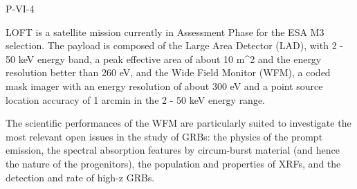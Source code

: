 P-VI-4


\bigskip



\bigskip

\noindent LOFT is a satellite mission currently in Assessment Phase for the
ESA M3 selection. The payload is composed of the Large Area
Detector (LAD), with 2 - 50 keV energy band, a peak effective area
of about 10 m^2 and the energy resolution better than 260 eV, and
the Wide Field Monitor (WFM), a coded mask imager with an energy
resolution of about 300 eV and a point source location accuracy of
1 arcmin in the 2 - 50 keV energy range.

The scientific performances of the WFM are particularly suited to
investigate the most relevant open issues in the study of GRBs: the
physics of the prompt emission, the spectral absorption features by
circum-burst material (and hence the nature of the progenitors),
the population and properties of XRFs, and the detection and rate of high-z GRBs.
